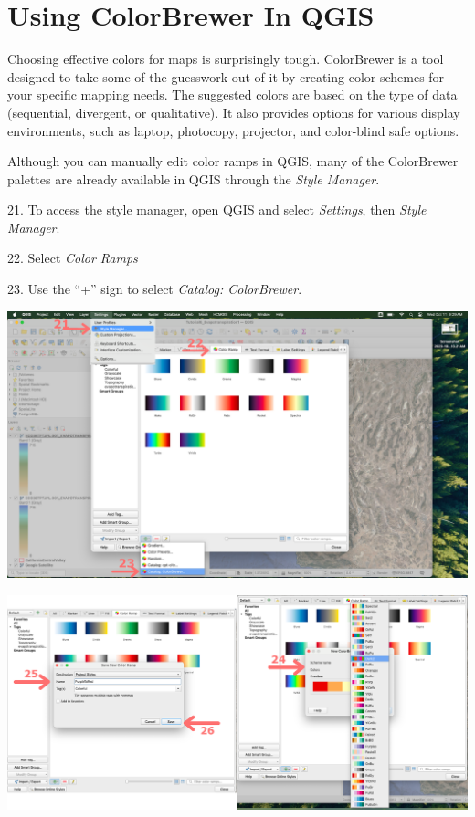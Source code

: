 \documentclass[oneside,a4paper,11pt,explicit]{book}
\begin{document}
\section{Using ColorBrewer In QGIS}

Choosing effective colors for maps is surprisingly tough. ColorBrewer is a tool designed to take some of the guesswork out of it by creating color schemes for your specific mapping needs. The suggested colors are based on the type of data (sequential, divergent, or qualitative). It also provides options for various display environments, such as laptop, photocopy, projector, and color-blind safe options. 

Although you can manually edit color ramps in QGIS, many of the ColorBrewer palettes are already available in QGIS through the \textit{Style Manager}. 

\vspace{1em}

21. To access the style manager, open QGIS and select \textit{Settings}, then \textit{Style Manager}.

22. Select \textit{Color Ramps}

23. Use the ``+'' sign to select \textit{Catalog: ColorBrewer}.

\centerline{\includegraphics[width=.87\textwidth]{StyleManager.png}}

\vspace{.5em}

\centerline{\includegraphics[width=.87\textwidth]{QGIScolorBrewer.png}}
\end{document}
